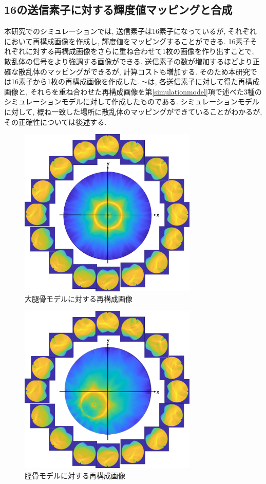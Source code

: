 \subsection{16の送信素子に対する輝度値マッピングと合成}
本研究でのシミュレーションでは, 送信素子は16素子になっているが, それぞれにおいて再構成画像を作成し, 輝度値をマッピングすることができる. 16素子それぞれに対する再構成画像をさらに重ね合わせて1枚の画像を作り出すことで, 散乱体の信号をより強調する画像ができる. 送信素子の数が増加するほどより正確な散乱体のマッピングができるが, 計算コストも増加する. そのため本研究では16素子から1枚の再構成画像を作成した. \verb|〜|は, 各送信素子に対して得た再構成画像と, それらを重ね合わせた再構成画像を第\ref{simulationmodel}項で述べた3種のシミュレーションモデルに対して作成したものである. シミュレーションモデルに対して, 概ね一致した場所に散乱体のマッピングができていることがわかるが, その正確性については後述する. 
\begin{figure}[H]
  \begin{center}
    \includegraphics[width=85mm]{fig/daitai16.pdf}
  \end{center}
  \caption{大腿骨モデルに対する再構成画像}
\end{figure}
\begin{figure}[H]
  \begin{center}
    \includegraphics[width=85mm]{fig/keikotsu16.pdf}
  \end{center}
  \caption{脛骨モデルに対する再構成画像}
\end{figure}
